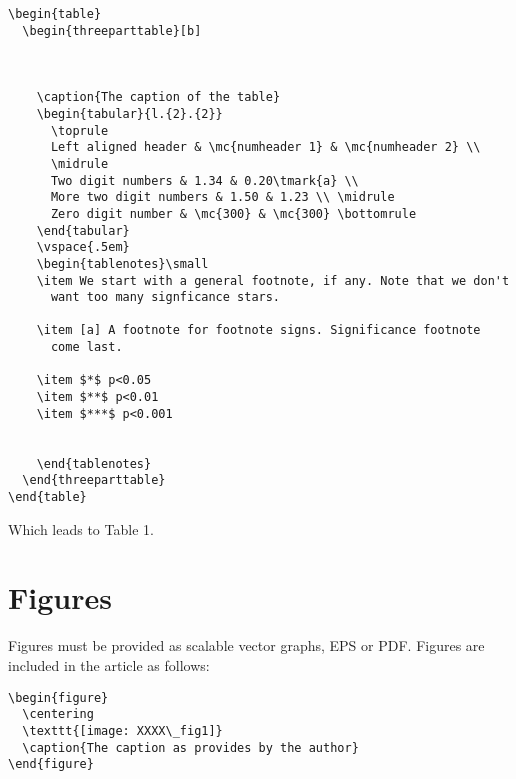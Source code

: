 \begin{scriptsize}
\begin{verbatim}
\begin{table}
  \begin{threeparttable}[b]
  
  
  
    \caption{The caption of the table}
    \begin{tabular}{l.{2}.{2}}
      \toprule
      Left aligned header & \mc{numheader 1} & \mc{numheader 2} \\ 
      \midrule
      Two digit numbers & 1.34 & 0.20\tmark{a} \\
      More two digit numbers & 1.50 & 1.23 \\ \midrule
      Zero digit number & \mc{300} & \mc{300} \bottomrule
    \end{tabular}
    \vspace{.5em}
    \begin{tablenotes}\small
    \item We start with a general footnote, if any. Note that we don't
      want too many signficance stars.
      
    \item [a] A footnote for footnote signs. Significance footnote
      come last.
      
    \item $*$ p<0.05
    \item $**$ p<0.01
    \item $***$ p<0.001


    \end{tablenotes}
  \end{threeparttable}
\end{table}
\end{verbatim}
\end{scriptsize}

Which leads to Table 1.




\section{Figures}


Figures must be provided as scalable vector graphs, EPS or
PDF. Figures are included in the article as follows:

\begin{verbatim}
\begin{figure}
  \centering
  \texttt{[image: XXXX\_fig1]}
  \caption{The caption as provides by the author}
\end{figure}
\end{verbatim}

